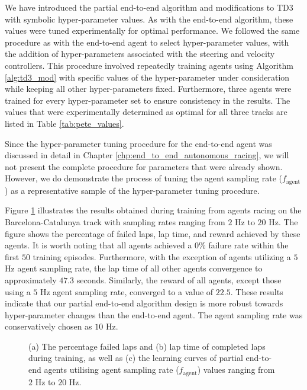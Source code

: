 We have introduced the partial end-to-end algorithm and modifications to TD3 with symbolic hyper-parameter values.
As with the end-to-end algorithm, these values were tuned experimentally for optimal performance.
We followed the same procedure as with the end-to-end agent to select hyper-parameter values, with the addition of hyper-parameters associated with the steering and velocity controllers.
This procedure involved repeatedly training agents using Algorithm \ref{alg:td3_mod} with specific values of the hyper-parameter under consideration while keeping all other hyper-parameters fixed.
Furthermore, three agents were trained for every hyper-parameter set to ensure consistency in the results.
The values that were experimentally determined as optimal for all three tracks are listed in Table \ref{tab:pete_values}.




Since the hyper-parameter tuning procedure for the end-to-end agent was discussed in detail in Chapter \ref{chp:end_to_end_autonomous_racing}, we will not present the complete procedure for parameters that were already shown. 
However, we do demonstrate the process of tuning the agent sampling rate ($f_{\text{agent}}$) as a representative sample of the hyper-parameter tuning procedure.

Figure \ref{fig:f_agent_pete} illustrates the results obtained during training from agents racing on the Barcelona-Catalunya track with sampling rates ranging from $2$ Hz to $20$ Hz. 
The figure shows the percentage of failed laps, lap time, and reward achieved by these agents. 
It is worth noting that all agents achieved a $0\%$ failure rate within the first $50$ training episodes.
Furthermore, with the exception of agents utilizing a $5$ Hz agent sampling rate, the lap time of all other agents convergence to approximately $47.3$ seconds. 
Similarly, the reward of all agents, except those using a $5$ Hz agent sampling rate, converged to a value of $22.5$.
These results indicate that our partial end-to-end algorithm design is more robust towards hyper-parameter changes than the end-to-end agent.
The agent sampling rate was conservatively chosen as $10$ Hz.

\begin{figure}[htb!]
    \centering
    
    \caption[Learning curves for partial end-to-end agents trained with different agent sampling rates]{(a) The percentage failed laps and (b) lap time of completed laps during training, as well as (c) the learning curves of partial end-to-end agents utilising agent sampling rate ($f_{\text{agent}}$) values ranging from $2$ Hz to $20$ Hz.}
    \label{fig:f_agent_pete}
\end{figure}

